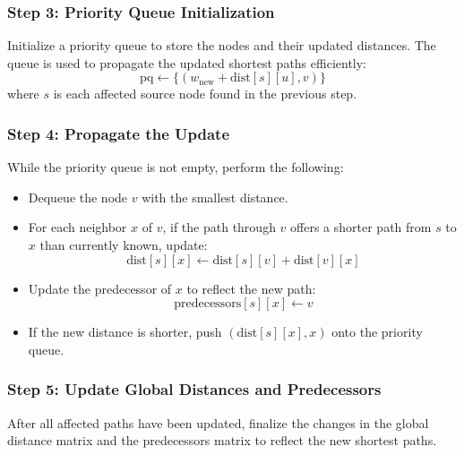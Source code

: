 \documentclass[conference]{IEEEtran}
\begin{document}
\subsubsection*{Step 3: Priority Queue Initialization}
Initialize a priority queue to store the nodes and their updated distances. The queue is used to propagate the updated shortest paths efficiently:
\[
\text{pq} \leftarrow \{ (w_{\text{new}} + \text{dist}[s][u], v) \}
\]
where \( s \) is each affected source node found in the previous step.
\subsubsection*{Step 4: Propagate the Update}
While the priority queue is not empty, perform the following:
\begin{itemize}
    \item Dequeue the node \( v \) with the smallest distance.
    \item For each neighbor \( x \) of \( v \), if the path through \( v \) offers a shorter path from \( s \) to \( x \) than currently known, update:
    \[
    \text{dist}[s][x] \leftarrow \text{dist}[s][v] + \text{dist}[v][x]
    \]
    \item Update the predecessor of \( x \) to reflect the new path:
    \[
    \text{predecessors}[s][x] \leftarrow v
    \]
    \item If the new distance is shorter, push \( (\text{dist}[s][x], x) \) onto the priority queue.
\end{itemize}

\subsubsection*{Step 5: Update Global Distances and Predecessors}
After all affected paths have been updated, finalize the changes in the global distance matrix and the predecessors matrix to reflect the new shortest paths.
\\
\end{document}
